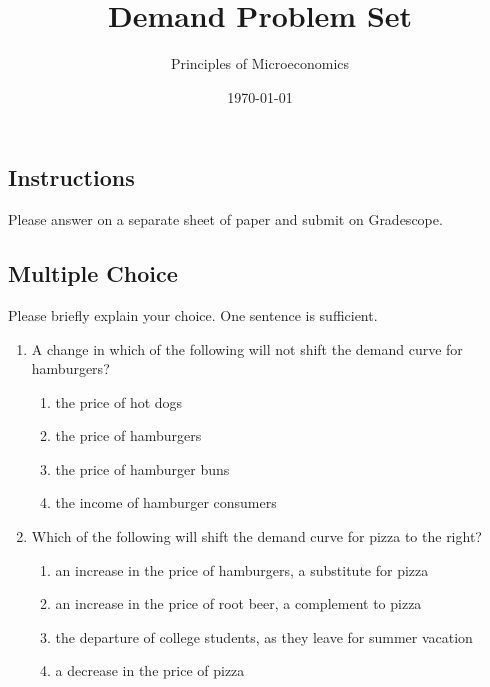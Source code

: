 \documentclass{article}
\title{Demand Problem Set}
\author{Principles of Microeconomics}
\date{\today}
\begin{document}
\maketitle

\subsection*{Instructions} Please answer on a separate sheet of paper and submit on Gradescope. 

\subsection*{Multiple Choice} Please briefly explain your choice. One sentence is sufficient.

\begin{enumerate}

\item A change in which of the following will not shift the demand curve for hamburgers?

	\begin{enumerate}
	
	\item the price of hot dogs
	
	\item the price of hamburgers
	
	\item the price of hamburger buns
	
	\item the income of hamburger consumers
	
	\end{enumerate}
	
\item Which of the following will shift the demand curve for pizza to the right?

	\begin{enumerate}
	
	\item an increase in the price of hamburgers, a substitute for pizza
	
	\item an increase in the price of root beer, a complement to pizza
	
	\item the departure of college students, as they leave for summer vacation
	
	\item a decrease in the price of pizza
	
	\end{enumerate}
	

\end{enumerate}
\end{document}
